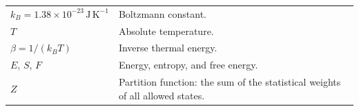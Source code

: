 {\begin{longtable}{@{}p{}p{}@{}}
$k_B = 1.38\times10^{-23}\,\mathrm{J\,K^{-1}}$ & Boltzmann constant. \\

$T$ & Absolute temperature. \\

$\beta=1/(k_BT)$ & Inverse thermal energy. \\

$E$, $S$, $F$ & Energy, entropy, and free energy. \\

$Z$ & Partition function: the sum of the statistical weights of all allowed states. \\

\end{longtable}
}